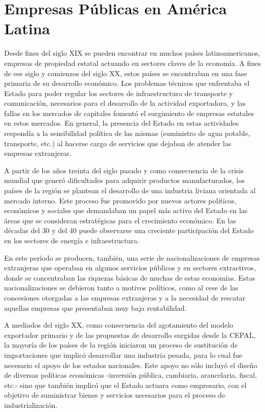 \documentclass[
  12pt,
  spanish,
]{book}
\begin{document}
\hypertarget{empresas-puxfablicas-en-amuxe9rica-latina}{%
\section{Empresas Públicas en América Latina}\label{empresas-puxfablicas-en-amuxe9rica-latina}}

Desde fines del siglo XIX se pueden encontrar en muchos países latinoamericanos, empresas de propiedad estatal actuando en sectores claves de la economía. A fines de ese siglo y comienzos del siglo XX, estos países se encontraban en una fase primaria de su desarrollo económico. Los problemas técnicos que enfrentaba el Estado para poder regular los sectores de infraestructura de transporte y comunicación, necesarios para el desarrollo de la actividad exportadora, y las fallas en los mercados de capitales fomentó el surgimiento de empresas estatales en estos mercados. En general, la presencia del Estado en estas actividades respondía a la sensibilidad política de las mismas (suministro de agua potable, transporte, etc.) al hacerse cargo de servicios que dejaban de atender las empresas extranjeras.

A partir de los años treinta del siglo pasado y como consecuencia de la crisis mundial que generó dificultades para adquirir productos manufacturados, los países de la región se plantean el desarrollo de una industria liviana orientada al mercado interno. Este proceso fue promovido por nuevos actores políticos, económicos y sociales que demandaban un papel más activo del Estado en las áreas que se consideran estratégicas para el crecimiento económico. En las décadas del 30 y del 40 puede observarse una creciente participación del Estado en los sectores de energía e infraestructura.

En este período se producen, también, una serie de nacionalizaciones de empresas extranjeras que operaban en algunos servicios públicos y en sectores extractivos, donde se concentraban las riquezas básicas de muchas de estas economías. Estas nacionalizaciones se debieron tanto a motivos políticos, como al cese de las concesiones otorgadas a las empresas extranjeras y a la necesidad de rescatar aquellas empresas que presentaban muy baja rentabilidad.

A mediados del siglo XX, como consecuencia del agotamiento del modelo exportador primario y de las propuestas de desarrollo surgidas desde la CEPAL, la mayoría de los países de la región iniciaron un proceso de sustitución de importaciones que implicó desarrollar una industria pesada, para lo cual fue necesario el apoyo de los estados nacionales. Este apoyo no sólo incluyó el diseño de diversas políticas económicas -inversión pública, cambiaria, arancelaria, fiscal, etc.- sino que también implicó que el Estado actuara como empresario, con el objetivo de suministrar bienes y servicios necesarios para el proceso de industrialización.
\end{document}
